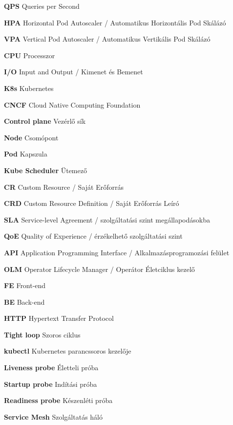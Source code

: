 \begin{multicols}{2}
\textbf{QPS} Queries per Second 

\textbf{HPA} Horizontal Pod Autoscaler / Automatikus Horizontális Pod Skálázó 

\textbf{VPA} Vertical Pod Autoscaler / Automatikus Vertikális Pod Skálázó 

\textbf{CPU} Processzor 

\textbf{I/O} Input and Output / Kimenet és Bemenet 

\textbf{K8s} Kubernetes 

\textbf{CNCF} Cloud Native Computing Foundation 

\textbf{Control plane} Vezérlő sík 

\textbf{Node} Csomópont 

\textbf{Pod} Kapszula 

\textbf{Kube Scheduler} Ütemező 

\textbf{CR} Custom Resource / Saját Erőforrás 

\textbf{CRD} Custom Resource Definition / Saját Erőforrás Leíró

\textbf{SLA} Service-level Agreement / szolgáltatási szint megállapodásokba

\textbf{QoE} Quality of Experience / érzékelhető szolgáltatási szint

\columnbreak

\textbf{API} Application Programming Interface / Alkalmazásprogramozási felület 

\textbf{OLM} Operator Lifecycle Manager / Operátor Életciklus kezelő 

\textbf{FE} Front-end 

\textbf{BE} Back-end 

\textbf{HTTP} Hypertext Transfer Protocol 

\textbf{Tight loop} Szoros ciklus 

\textbf{kubectl} Kubernetes parancssoros kezelője 

\textbf{Liveness probe} Életteli próba 

\textbf{Startup probe} Indítási próba 

\textbf{Readiness probe} Készenléti próba 

\textbf{Service Mesh} Szolgáltatás háló

\end{multicols}

